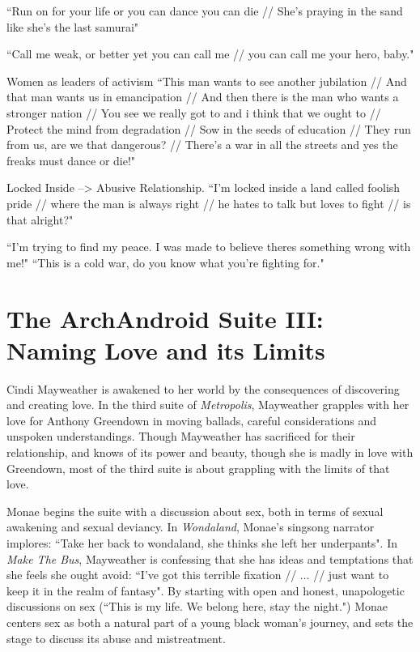 \documentclass[a4paper, 11pt]{article} %
\begin{document}
``Run on for your life or you can dance you can die // She's praying in the sand like she's the last samurai"\cite{danceordie}

``Call me weak, or better yet you can call me // you can call me your hero, baby."\cite{faster}

Women as leaders of activism
``This man wants to see another jubilation //
And that man wants us in emancipation //
And then there is the man who wants a stronger nation //
You see we really got to and i think that we ought to //
Protect the mind from degradation //
Sow in the seeds of education //
They run from us, are we that dangerous? //
There's a war in all the streets and yes the freaks must dance or die!"\cite{danceordie}

Locked Inside --> Abusive Relationship.
``I'm locked inside a land called foolish pride // where the man is always right // he hates to talk but loves to fight // is that alright?"\cite{lockedinside}

``I'm trying to find my peace.  I was made to believe theres something wrong with me!"\cite{coldwar}
``This is a cold war, do you know what you're fighting for."\cite{coldwar}




\section*{The ArchAndroid Suite III: Naming Love and its Limits}

Cindi Mayweather is awakened to her world by the consequences of discovering and creating love.
In the third suite of \emph{Metropolis}, Mayweather grapples with her love for Anthony Greendown in moving ballads, careful considerations and unspoken understandings.
Though Mayweather has sacrificed for their relationship, and knows of its power and beauty, though she is madly in love with Greendown, most of the third suite is about grappling with the limits of that love. 

Monae begins the suite with a discussion about sex, both in terms of sexual awakening and sexual deviancy.
In \emph{Wondaland}, Monae's singsong narrator implores: ``Take her back to wondaland, she thinks she left her underpants"\cite{wondaland}.
In \emph{Make The Bus}, Mayweather is confessing that she has ideas and temptations that she feels she ought avoid:
``I've got this terrible fixation // ... // just want to keep it in the realm of fantasy"\cite{makethebus}.
By starting with open and honest, unapologetic discussions on sex (``This is my life. We belong here, stay the night."\cite{wondaland}) Monae centers sex as both a natural part of a young black woman's journey, and sets the stage to discuss its abuse and mistreatment.
\end{document}
